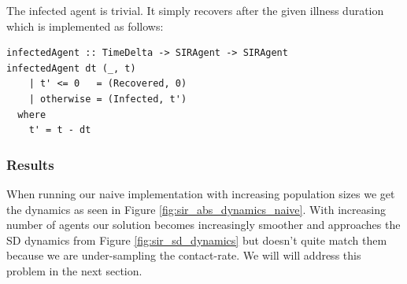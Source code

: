 The infected agent is trivial. It simply recovers after the given illness duration which is implemented as follows:

\begin{verbatim}
infectedAgent :: TimeDelta -> SIRAgent -> SIRAgent
infectedAgent dt (_, t) 
    | t' <= 0   = (Recovered, 0)
    | otherwise = (Infected, t')
  where
    t' = t - dt  
\end{verbatim}

\subsubsection{Results}
When running our naive implementation with increasing population sizes we get the dynamics as seen in Figure \ref{fig:sir_abs_dynamics_naive}. With increasing number of agents \cite{macal_agent-based_2010} our solution becomes increasingly smoother and approaches the SD dynamics from Figure \ref{fig:sir_sd_dynamics}  but doesn't quite match them because we are under-sampling the contact-rate. We will will address this problem in the next section.

